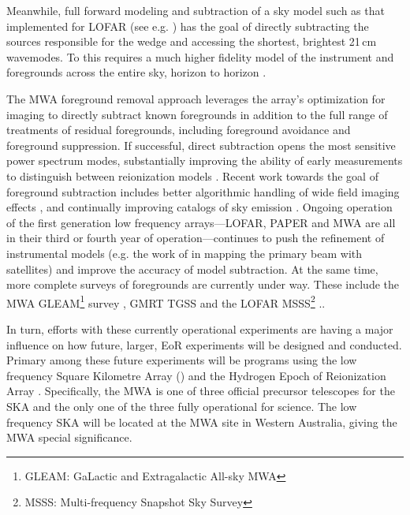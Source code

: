 \documentclass[twolcolumn,iop]{emulateapj}
\begin{document}
 Meanwhile, full forward modeling and subtraction of a sky model such as that implemented for LOFAR (see e.g. \cite{Jelic:2008p2130,Yatawatta:2013p9699}) has the goal of directly subtracting the sources responsible for the wedge and accessing the shortest, brightest 21\,cm wavemodes. To this requires a much higher fidelity model of the instrument and foregrounds across the entire sky, horizon to horizon \cite{2015ApJ...804...14T}.


The MWA foreground removal approach leverages the array's optimization for imaging to directly subtract known foregrounds in addition to the full range of treatments of residual foregrounds, including foreground avoidance and foreground suppression.  If successful, direct subtraction opens the most sensitive power spectrum modes, substantially improving the ability of early measurements to distinguish between reionization models \citep{Beardsley:2013p9952,Pober:2014p10390}. Recent work towards the goal of foreground subtraction includes better algorithmic handling of wide field imaging effects \citep{Tasse:2012p9459,Bhatnagar..2013ApJ,Sullivan:2012p9457,Ord:2010p8442,2014MNRAS.444..606O}, and continually improving catalogs of sky emission \citep{deOliveiraCosta:2008p2242,Jacobs:2011p8438,2013ApJ...776..108J,Hurley-walker:2014p45}. Ongoing operation of the first generation low frequency arrays---LOFAR, PAPER and MWA are all in their  third or fourth year of operation---continues to push the refinement of instrumental models (e.g. the work of \cite{2015RaSc...50..614N} in mapping the primary beam with satellites) and improve the accuracy of model subtraction.  At the same time, more complete surveys of foregrounds are currently under way. These include the MWA GLEAM\footnote{GLEAM: GaLactic and Extragalactic All-sky MWA} survey \citep{2015PASA...32...25W}, GMRT TGSS\citep{Intema:2016arXiv160304368I}  and the LOFAR MSSS\footnote{MSSS: Multi-frequency Snapshot Sky Survey} \citep{2015A&A...582A.123H}..   

In turn, efforts with these currently operational experiments are having a major influence on how future, larger, EoR experiments will be designed and conducted.  Primary among these future experiments will be programs using the low frequency Square Kilometre Array (\cite{2014aska.confE...1K}) and the Hydrogen Epoch of Reionization Array \citep[HERA;][]{Pober:2014p10390}.  Specifically, the MWA is one of three official precursor telescopes for the SKA and the only one of the three fully operational for science.  The low frequency SKA will be located at the MWA site in Western Australia, giving the MWA special significance.
\end{document}
